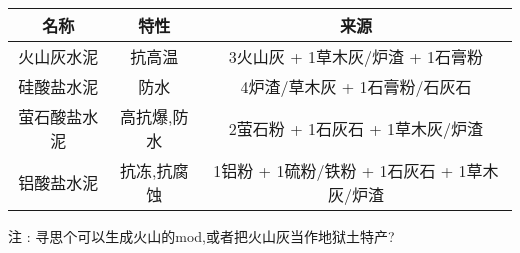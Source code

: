 {{{          \begin{center}
              \begin{tabular}{|c|c|c|}
                  \hline
                  名称         & 特性        & 来源                                        \\
                  \hline
                  火山灰水泥   & 抗高温      & 3火山灰 + 1草木灰/炉渣 + 1石膏粉            \\
                  \hline
                  硅酸盐水泥   & 防水        & 4炉渣/草木灰 + 1石膏粉/石灰石               \\
                  \hline
                  萤石酸盐水泥 & 高抗爆,防水 & 2萤石粉 + 1石灰石 + 1草木灰/炉渣            \\
                  \hline
                  铝酸盐水泥   & 抗冻,抗腐蚀 & 1铝粉 + 1硫粉/铁粉 + 1石灰石 + 1草木灰/炉渣 \\
                  \hline
              \end{tabular}
          \end{center}

          注 : 寻思个可以生成火山的mod,或者把火山灰当作地狱土特产?
      }\label{cement}

  }
 }

